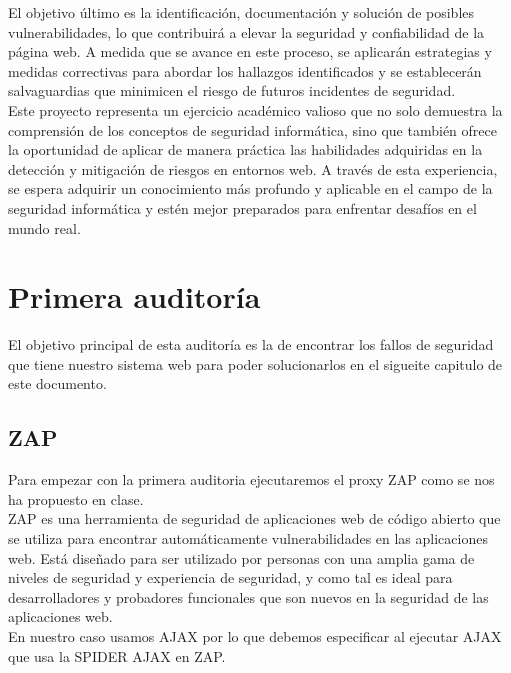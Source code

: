 \documentclass{report}
\begin{document}
        El objetivo último es la identificación, documentación y solución de posibles vulnerabilidades, lo que contribuirá a elevar la seguridad y confiabilidad de la página web. A medida que se avance en este proceso, se aplicarán estrategias y medidas correctivas para abordar los hallazgos identificados y se establecerán salvaguardias que minimicen el riesgo de futuros incidentes de seguridad.\\
        
        Este proyecto representa un ejercicio académico valioso que no solo demuestra la comprensión de los conceptos de seguridad informática, sino que también ofrece la oportunidad de aplicar de manera práctica las habilidades adquiridas en la detección y mitigación de riesgos en entornos web. A través de esta experiencia, se espera adquirir un conocimiento más profundo y aplicable en el campo de la seguridad informática y estén mejor preparados para enfrentar desafíos en el mundo real.\\
    \chapter{Primera auditoría}
        El objetivo principal de esta auditoría es la de encontrar los fallos de seguridad que tiene nuestro sistema web para poder solucionarlos en el sigueite capitulo de este documento.
        \section{ZAP}
            Para empezar con la primera auditoria ejecutaremos el proxy ZAP como se nos ha propuesto en clase.\\
            
            ZAP es una herramienta de seguridad de aplicaciones web de código abierto que se utiliza para encontrar automáticamente vulnerabilidades en las aplicaciones web. Está diseñado para ser utilizado por personas con una amplia gama de niveles de seguridad y experiencia de seguridad, y como tal es ideal para desarrolladores y probadores funcionales que son nuevos en la seguridad de las aplicaciones web.\\
            
            En nuestro caso usamos AJAX por lo que debemos especificar al ejecutar AJAX que usa la SPIDER AJAX en ZAP.\\
            
\end{document}
